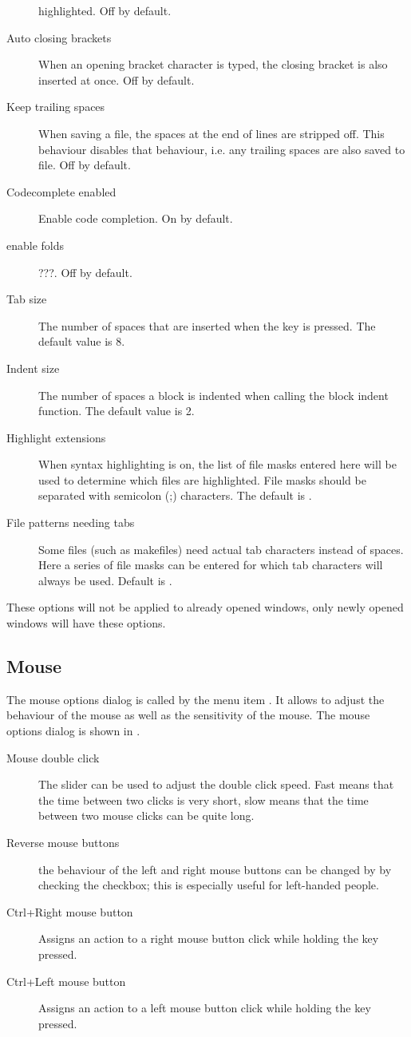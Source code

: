 \begin{description}
highlighted. Off by default.
\item[Auto closing brackets]
When an opening bracket character is typed, the closing bracket is also
inserted at once. Off by default.
\item[Keep trailing spaces]
When saving a file, the spaces at the end of lines are stripped off. This
behaviour disables that behaviour, i.e. any trailing spaces are also saved
to file. Off by default.
\item[Codecomplete enabled]
Enable code completion. On by default.
\item[enable folds]
???. Off by default.
\item[Tab size]
The number of spaces that are inserted when the  key is pressed.
The default value is 8.
\item[Indent size]
The number of spaces a block is indented when calling the block indent function.
The default value is 2.
\item[Highlight extensions]
When syntax highlighting is on, the list of file masks entered here will be
used to determine which files are highlighted. File masks should be
separated with semicolon (;) characters. The default is
.
\item[File patterns needing tabs]
Some files (such as makefiles) need actual tab characters instead of spaces.
Here a series of file masks can be entered for which tab characters will
always be used. Default is .
\end{description}
\begin{remark}
These options will not be applied to already opened windows, only newly
opened windows will have these options.
\end{remark}
%
%
\subsection{Mouse}
\label{se:prefmouse}
The mouse options dialog is called by the menu item
. It allows to adjust the behaviour of the
mouse as well as the sensitivity of the mouse.
The mouse options dialog is shown in .


\begin{description}
\item[Mouse double click]
The slider can be used to adjust the double click speed. Fast means that the
time between two clicks is very short, slow means that the time between two
mouse clicks can be quite long.
\item[Reverse mouse buttons]
the behaviour of the left and right mouse buttons can be changed by
by checking the checkbox; this is especially useful for left-handed people.
\item[Ctrl+Right mouse button]
Assigns an action to a right mouse button click while holding the
 key pressed.
\item[Ctrl+Left mouse button]
Assigns an action to a left mouse button click while holding the
 key pressed.
\end{description}

